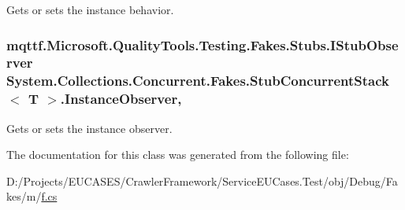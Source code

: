 Gets or sets the instance behavior.

\hypertarget{class_system_1_1_collections_1_1_concurrent_1_1_fakes_1_1_stub_concurrent_stack_3_01_t_01_4_a16abd142a71a91098efdda8f8da91ef0}{
\subsubsection[{Instance\-Observer}]{\setlength{\rightskip}{0pt plus 5cm}mqttf.\-Microsoft.\-Quality\-Tools.\-Testing.\-Fakes.\-Stubs.\-I\-Stub\-Observer System.\-Collections.\-Concurrent.\-Fakes.\-Stub\-Concurrent\-Stack$<$ T $>$.Instance\-Observer\hspace{0.3cm}{\ttfamily [get]}, {\ttfamily [set]}}}\label{class_system_1_1_collections_1_1_concurrent_1_1_fakes_1_1_stub_concurrent_stack_3_01_t_01_4_a16abd142a71a91098efdda8f8da91ef0}


Gets or sets the instance observer.



The documentation for this class was generated from the following file\-:\begin{DoxyCompactItemize}
\item 
D\-:/\-Projects/\-E\-U\-C\-A\-S\-E\-S/\-Crawler\-Framework/\-Service\-E\-U\-Cases.\-Test/obj/\-Debug/\-Fakes/m/\hyperlink{m_2f_8cs}{f.\-cs}\end{DoxyCompactItemize}
